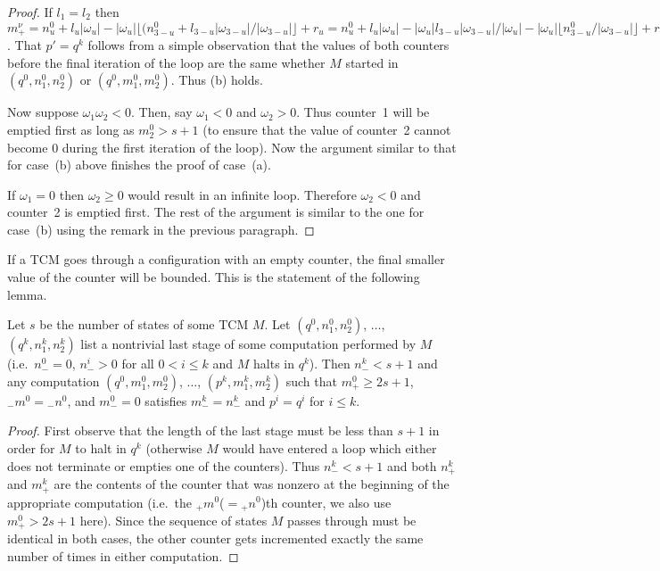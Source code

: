 \documentclass[12pt]{article}
\begin{document}
\begin{proof}
If $l_1=l_2$ then $m^\nu_+=n^0_u+l_u|\omega_u|-|\omega_u|\lfloor
(n^0_{3-u}+l_{3-u}|\omega_{3-u}|/|\omega_{3-u}|\rfloor+r_u=
n^0_u+l_u|\omega_u|-|\omega_u|l_{3-u}|\omega_{3-u}|/|\omega_u|-|\omega_u|\lfloor
n^0_{3-u}/|\omega_{3-u}|\rfloor+r_u=n^0_u+\omega_u\lfloor
n^0_{3-u}/|\omega_{3-u}|+r_u$.
That $p'=q^k$ follows from a simple observation that the values of
both counters before the final iteration of the loop are the same
whether $M$ started in $(q^0, n^0_1, n^0_2)$ or $(q^0, m^0_1, m^0_2)$.
Thus (b) holds.

Now suppose $\omega_1\omega_2<0$. Then, say $\omega_1<0$ and
$\omega_2>0$. Thus counter~1 will be emptied first as long as
$m^0_2>s+1$ (to ensure that the value of counter~2 cannot become 0
during the first iteration of the loop). Now the argument similar to
that for case~(b) above finishes the proof of case~(a).

If $\omega_1=0$ then $\omega_2\geq0$ would result in an infinite
loop. Therefore $\omega_2<0$ and counter~2 is emptied first. The rest
of the argument is similar to the one for case~(b) using the remark in
the previous paragraph.
\end{proof}

If a TCM goes through a configuration with an empty counter, the final
smaller value of the counter will be bounded. This is the statement of
the following lemma. 
\begin{lemma}\label{lstg}
Let $s$ be the number of states of some TCM $M$. Let $(q^0, n^0_1,
n^0_2)$, $\ldots$, $(q^k, n^k_1, n^k_2)$ list a nontrivial last stage of some computation
performed by $M$ (i.e.\ $n^0_-=0$, $n^i_->0$ for all $0<i\leq k$ and
$M$ halts in $q^k$). Then $n^k_-<s+1$ and any computation $(q^0, m^0_1, m^0_2)$, $\ldots$, $(p^k, m^k_1,
m^k_2)$ such that $m^0_+\geq 2s+1$, ${}_-m^0={}_-n^0$, and $m^0_-=0$
satisfies $m^k_-=n^k_-$ and $p^i=q^i$ for $i\leq k$. 
\end{lemma}
\begin{proof}
First observe that the length of the last stage must be less than
$s+1$ in order for $M$ to halt in $q^k$ (otherwise $M$ would have entered a
loop which either does not terminate or empties one of the
counters). Thus $n^k_-<s+1$ and both $n^k_+$ and $m^k_+$ are the contents of the counter that was
nonzero at the beginning of the appropriate computation (i.e.\ the
${}_+m^0$($={}_+n^0$)th
counter, we also use $m^0_+>2s+1$ here). Since the sequence of
states $M$ passes through must be identical in both cases, the other
counter gets incremented exactly the same number of times in either
computation.
\end{proof}
\end{document}
